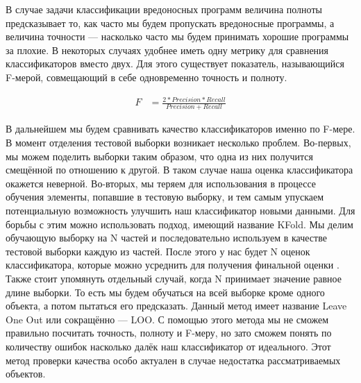 В случае задачи классификации вредоносных программ величина полноты предсказывает то, как часто мы будем пропускать вредоносные программы, а величина точности — насколько часто мы будем принимать хорошие программы за плохие.
В некоторых случаях удобнее иметь одну метрику для сравнения классификаторов вместо двух.
Для этого существует показатель, называющийся F-мерой, совмещающий в себе одновременно точность и полноту.

\begin{figure}[ht]
\begin{align}
F &= \frac{2 * Precision * Recall}{Precision + Recall}
\end{align}
\end{figure}

В дальнейшем мы будем сравнивать качество классификаторов именно по F-мере.
В момент отделения тестовой выборки возникает несколько проблем. Во-первых, мы можем поделить выборки таким образом, что одна из них получится смещённой по отношению к другой. В таком случае наша оценка классификатора окажется неверной. Во-вторых, мы теряем для использования в процессе обучения элементы, попавшие в тестовую выборку, и тем самым упускаем потенциальную возможность улучшить наш классификатор новыми данными. Для борьбы с этим можно использовать подход, имеющий название KFold. Мы делим обучающую выборку на N частей и последовательно используем в качестве тестовой выборки каждую из частей. После этого у нас будет N оценок классификатора, которые можно усреднить для получения финальной оценки \cite{cv}. 
Также стоит упомянуть отдельный случай, когда N принимает значение равное длине выборки. То есть мы будем обучаться на всей выборке кроме одного объекта, а потом пытаться его предсказать. Данный метод имеет название Leave One Out или сокращённо — LOO. С помощью этого метода мы не сможем правильно посчитать точность, полноту и F-меру, но зато сможем понять по количеству ошибок насколько далёк наш классификатор от идеального. Этот метод проверки качества особо актуален в случае недостатка рассматриваемых объектов. 

